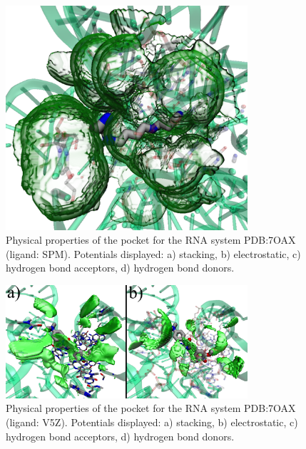     \begin{figure}[H]
      \centering
      \includegraphics[width=0.8\textwidth]{figures/results/benchmark_rna/7oax0.png}
      \caption{\label{fig:benchmark/7oax0} Physical properties of the pocket for the RNA system PDB:7OAX (ligand: SPM). Potentials displayed: a) stacking, b) electrostatic, c) hydrogen bond acceptors, d) hydrogen bond donors.}
    \end{figure}

    \begin{figure}[H]
      \centering
      \includegraphics[width=0.8\textwidth]{figures/results/benchmark_rna/7oax1.png}
      \caption{\label{fig:benchmark/7oax1} Physical properties of the pocket for the RNA system PDB:7OAX (ligand: V5Z). Potentials displayed: a) stacking, b) electrostatic, c) hydrogen bond acceptors, d) hydrogen bond donors.}
    \end{figure}


